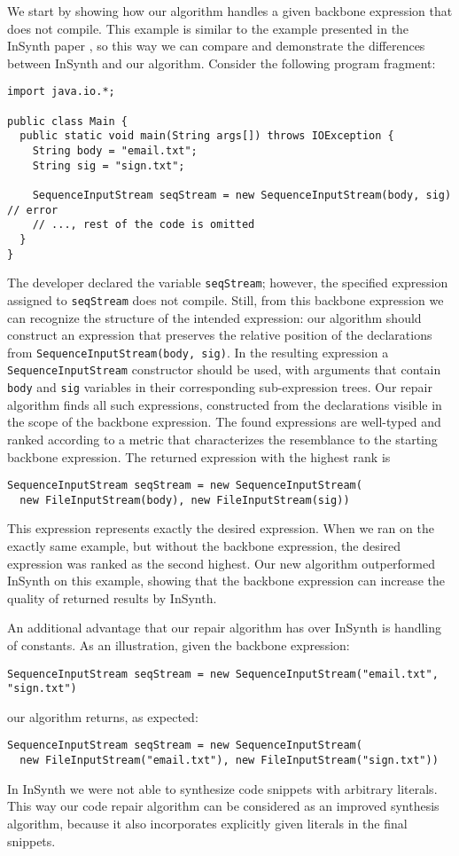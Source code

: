 We start by showing how our algorithm handles a given backbone 
expression that does not compile. This example is similar to the 
example presented in the InSynth paper
\cite{GveroETAL13CompleteCompletionTypesWeights}, so this way we can compare and 
demonstrate the differences between InSynth and our algorithm. Consider the following program fragment:
\begin{lstlisting}
import java.io.*;

public class Main {
  public static void main(String args[]) throws IOException {
    String body = "email.txt";
    String sig = "sign.txt";
    
    SequenceInputStream seqStream = new SequenceInputStream(body, sig) // error
    // ..., rest of the code is omitted
  }
} 
\end{lstlisting}
The developer declared the variable \lstinline{seqStream}; however, the specified 
expression assigned to \lstinline{seqStream} does not compile. Still, from this backbone expression 
we can recognize the structure of the intended expression: our algorithm should construct 
an expression that preserves the relative position of the declarations from 
\lstinline{SequenceInputStream(body, sig)}. In the resulting expression a \lstinline{SequenceInputStream} constructor
should be used, with arguments that contain \lstinline{body} and \lstinline{sig} variables in their
corresponding sub-expression trees. Our repair algorithm finds all such expressions, 
constructed from the
declarations visible in the scope of the backbone expression. The found expressions are well-typed 
and ranked according to a metric that characterizes the
resemblance to the starting backbone expression.
The returned expression with the highest rank is
\begin{lstlisting}
SequenceInputStream seqStream = new SequenceInputStream(
  new FileInputStream(body), new FileInputStream(sig))
\end{lstlisting}
This expression represents exactly the desired expression.
When we ran \cite{GveroETAL13CompleteCompletionTypesWeights} on the exactly same example, but without 
the backbone expression, the desired expression was
ranked as the second highest. Our new algorithm outperformed InSynth on this example, showing
that the backbone expression can increase the quality of returned results by InSynth.

An additional advantage that our repair algorithm has over InSynth is handling of constants. 
As an illustration, given the backbone expression:
\begin{lstlisting}
SequenceInputStream seqStream = new SequenceInputStream("email.txt", "sign.txt") 
\end{lstlisting}
our algorithm returns, as expected:
\begin{lstlisting}
SequenceInputStream seqStream = new SequenceInputStream(
  new FileInputStream("email.txt"), new FileInputStream("sign.txt"))
\end{lstlisting}
In InSynth we were not able to synthesize code snippets with arbitrary literals. 
This way our code repair algorithm can be considered as an improved synthesis algorithm,
because it also incorporates explicitly given literals in the final snippets.

